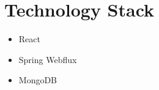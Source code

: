 \section{Technology Stack}

\begin{itemize}
    \item React
    \item Spring Webflux
    \item MongoDB
\end{itemize}
